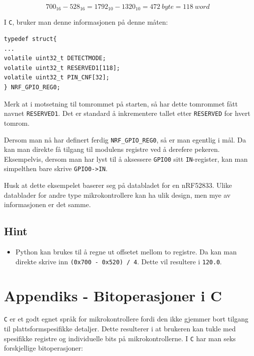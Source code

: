 \begin{equation}
     700_{16} - 528_{16} = 1792_{10} - 1320_{10} = 472 \ byte = 118 \ word
\end{equation}

I \verb|C|, bruker man denne informasjonen på denne måten:

\begin{lstlisting}
typedef struct{
...
volatile uint32_t DETECTMODE;
volatile uint32_t RESERVED1[118];
volatile uint32_t PIN_CNF[32];
} NRF_GPIO_REG0;
\end{lstlisting}


Merk at i motsetning til tomrommet på starten, så har dette tomrommet fått navnet \verb|RESERVED1|. Det er standard å inkrementere tallet etter \verb|RESERVED| for hvert tomrom.


Dersom man nå har definert ferdig \verb|NRF_GPIO_REG0|, så er man egentlig i mål. Da kan man direkte få tilgang til modulens registre ved å derefere pekeren. Eksempelvis, dersom man har lyst til å aksessere \verb|GPIO0| sitt \verb|IN|-register, kan man simpelthen bare skrive \verb|GPIO0->IN|.

\textcolor{RWTHrot100}{Husk at dette eksempelet baserer seg på databladet for en nRF52833. Ulike datablader for andre type mikrokontrollere kan ha ulik design, men mye av informasjonen er det samme.}

\subsection{Hint}
\begin{itemize}
    \item Python kan brukes til å regne ut offsetet mellom to registre. Da kan man direkte skrive inn \verb|(0x700 - 0x520) / 4|. Dette vil resultere i \verb|120.0|.

\end{itemize}



\section{Appendiks - Bitoperasjoner i C}\label{app:bit}


\verb|C| er et godt egnet språk for mikrokontrollere fordi den ikke gjemmer bort tilgang til plattsformspesifikke detaljer. Dette resulterer i at brukeren kan tukle med spesifikke registre og individuelle bits på mikrokontrollerne. I \verb|C| har man seks forskjellige bitoperasjoner: 

